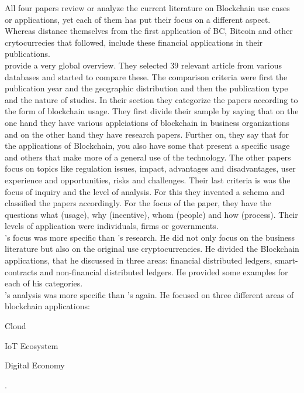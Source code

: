 All four papers \cite{2017_Kogon,2018_Li,2018_Miraz, 2017_Tama} review or analyze the current literature on Blockchain use cases or applications, yet each of them has put their focus on a different aspect.
Whereas  distance themselves from the first application of BC, Bitcoin and other crytocurrecies that followed,  include these financial applications in their publications.\\
\citet{2018_Li} provide a very global overview. They selected 39 relevant article from various databases and started to compare these. The comparison criteria were first the publication year and the geographic distribution and then the publication type and the nature of studies. In their section  \citep[chap. 3.3]{2018_Li} they categorize the papers according to the form of blockchain usage. They first divide their sample by saying that on the one hand they have various applciations of blockchain in business organizations and on the other hand they have research papers. Further on, they say that for the applications of Blockchain, you also have some that present a specific usage and others that make more of a general use of the technology. The other papers focus on topics like regulation issues, impact, advantages and disadvantages, user experience and opportunities, risks and challenges. Their last criteria is was the focus of inquiry and the level of analysis. For this they invented a schema and classified the papers accordingly. For the focus of the paper, they have the questions what (usage), why (incentive), whom (people) and how (process). Their levels of application were individuals, firms or governments.\\
\citet{2017_Kogon}'s focus was more specific than \cite{2018_Li}'s research. He did not only focus on the business literature but also on the original use cryptocurrencies. He divided the Blockchain applications, that he discussed in three areas: financial distributed ledgers, smart-contracts and non-financial distributed ledgers. He provided some examples for each of his categories.\\
\cite{2018_Miraz}'s analysis was more specific than \cite{2017_Kogon}'s again. He focused on three different areas of blockchain applications: 
\begin{enumerate*}[label={\arabic*)},font={\color{red!50!black}\bfseries}]
\item Cloud
\item IoT Ecosystem
\item Digital Economy \cite{2016_Underwood}
\end{enumerate*}.


